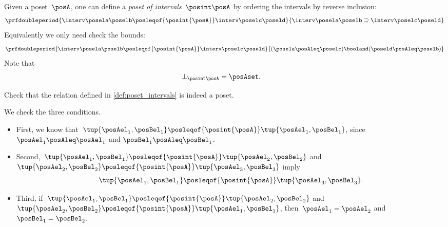 \begin{definition}
	\label{def:poset_intervals}
	Given a poset~$\posA$, one can define a \emph{poset of intervals}~$\posint\posA$
	by ordering the intervals by reverse inclusion:
	\begin{equation}
		\prfdoubleperiod{
			\interv \posela \poselb
			\posleqof{\posint{\posA}}
			\interv \poselc \poseld
		}{
			\interv \posela \poselb
			\supseteq
			\interv \poselc \poseld
		}
	\end{equation}
	Equivalently we only need check the bounds:
	\begin{equation}
		\prfdoubleperiod{
			\interv \posela \poselb
			\posleqof{\posint{\posA}}
			\interv \poselc \poseld
		}{
			(\posela \posAleq \poselc ) \booland (\poseld \posAleq \poselb)
		}
	\end{equation}
	Note that
	\begin{align}
		\bot_{\posint \posA} & = \posAset.
	\end{align}
\end{definition}
\begin{exercise}
	Check that the relation defined in \cref{def:poset_intervals} is indeed a poset.
\end{exercise}
\begin{solution}
	We check the three conditions.
	\begin{itemize}
		\item First, we know that~$\tup{\posAel_1,\posBel_1}\posleqof{\posint{\posA}}\tup{\posAel_1,\posBel_1}$, since $\posAel_1\posAleq \posAel_1$ and $\posBel_1\posAleq \posBel_1$.
		\item Second,~$\tup{\posAel_1,\posBel_1}\posleqof{\posint{\posA}}\tup{\posAel_2,\posBel_2}$ and $\tup{\posAel_2,\posBel_2}\posleqof{\posint{\posA}}\tup{\posAel_3,\posBel_3}$ imply
		      \begin{equation}
			      \tup{\posAel_1,\posBel_1}\posleqof{\posint{\posA}}\tup{\posAel_3,\posBel_3}.
		      \end{equation}
		\item Third, if~$\tup{\posAel_1,\posBel_1}\posleqof{\posint{\posA}}\tup{\posAel_2,\posBel_2}$ and $\tup{\posAel_2,\posBel_2}\posleqof{\posint{\posA}}\tup{\posAel_1,\posBel_1}$, then~$\posAel_1=\posAel_2$ and~$\posBel_1=\posBel_2$.
	\end{itemize}
\end{solution}
\vfill
\clearpage
